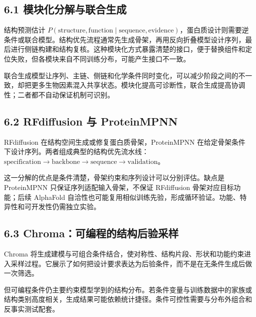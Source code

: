 \documentclass[10pt]{article}
\begin{document}
\subsection*{6.1 模块化分解与联合生成}


结构预测估计 \(P(\mathrm{structure},\mathrm{function}\mid\mathrm{sequence},\mathrm{evidence})\)，蛋白质设计则需要逆条件或联合模型。结构优先流程通常先生成骨架，再用反向折叠模型设计序列，最后进行侧链构建和结构复核。这种模块化方式暴露清楚的接口，便于替换组件和定位失败，但各模块来自不同训练分布，可能产生接口不一致。\par

联合生成模型让序列、主链、侧链和化学条件同时变化，可以减少阶段之间的不一致，却把更多生物因素混入共享状态。模块化提高可诊断性，联合生成提高协调性；二者都不自动保证机制可识别。\par

\subsection*{6.2 RFdiffusion 与 ProteinMPNN}


RFdiffusion 在结构空间生成或修复蛋白质骨架，ProteinMPNN 在给定骨架条件下设计序列。两者组成典型的结构优先流水线：\(\mathrm{specification}\to\mathrm{backbone}\to\mathrm{sequence}\to\mathrm{validation}\)。\par

这一分解的优点是条件清楚，骨架约束和序列设计可以分别评估。缺点是 ProteinMPNN 只保证序列适配输入骨架，不保证 RFdiffusion 骨架对应目标功能；后续 AlphaFold 自洽性也可能复用相似训练先验，形成循环验证。功能、特异性和可开发性仍需独立实验。\par

\subsection*{6.3 Chroma：可编程的结构后验采样}


Chroma 将生成建模与可组合条件结合，使对称性、结构片段、形状和功能约束进入采样过程。它展示了如何把设计要求表达为后验条件，而不是在无条件生成后做一次筛选。\par

但可编程条件仍主要约束模型学到的结构分布。若条件变量与训练数据中的家族或结构类别高度相关，生成结果可能依赖统计捷径。条件可控性需要与分布外组合和反事实测试配套。\par
\end{document}

